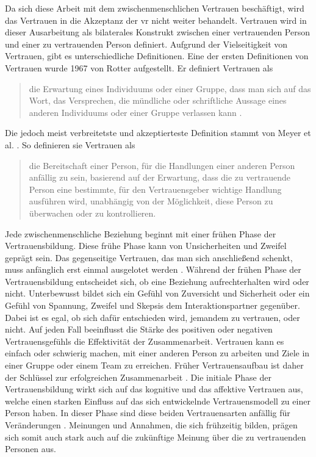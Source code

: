 \documentclass[a4paper,11pt]{article}%
\renewcommand{\\}{\vspace*{0.5\baselineskip} \newline}
\begin{document}
Da sich diese Arbeit mit dem zwischenmenschlichen Vertrauen beschäftigt, wird das Vertrauen in die Akzeptanz der \ac{vr} nicht weiter behandelt.
Vertrauen wird in dieser Ausarbeitung als bilaterales Konstrukt zwischen einer vertrauenden Person und einer zu vertrauenden Person definiert.
Aufgrund der Vielseitigkeit von Vertrauen, gibt es unterschiedliche Definitionen. \newline
Eine der ersten Definitionen von Vertrauen wurde 1967 von Rotter aufgestellt. Er definiert Vertrauen als 
\begin{quote}
\glqq{}die Erwartung eines Individuums oder einer Gruppe, dass man sich auf das Wort, das Versprechen, die mündliche oder schriftliche Aussage eines anderen Individuums oder einer Gruppe verlassen kann\dq{} \citep[S.651]{rotter1967new}.
\end{quote}
Die jedoch meist verbreitetste und akzeptierteste Definition stammt von Meyer et al. \citep[S.712]{mayer1995integrative}. So definieren sie Vertrauen als 
\begin{quote} \glqq{}die Bereitschaft einer Person, für die Handlungen einer anderen Person anfällig zu sein, basierend auf der Erwartung, dass die zu vertrauende Person eine bestimmte, für den Vertrauensgeber wichtige Handlung ausführen wird, unabhängig von der Möglichkeit, diese Person zu überwachen oder zu kontrollieren.\dq{} \end{quote}
Jede zwischenmenschliche Beziehung beginnt mit einer frühen Phase der Vertrauensbildung. Diese frühe Phase kann von Unsicherheiten und Zweifel geprägt sein. Das gegenseitige Vertrauen, das man sich anschließend schenkt, muss anfänglich erst einmal ausgelotet werden \citep[S.166-168]{meyerson1996swift}.
Während der frühen Phase der Vertrauensbildung entscheidet sich, ob eine Beziehung aufrechterhalten wird oder nicht. Unterbewusst bildet sich ein Gefühl von Zuversicht und Sicherheit oder ein Gefühl von Spannung, Zweifel und Skepsis dem Interaktionspartner gegenüber. 
Dabei ist es egal, ob sich dafür entschieden wird, jemandem zu vertrauen, oder nicht. Auf jeden Fall beeinflusst die Stärke des positiven oder negativen Vertrauensgefühls die Effektivität der Zusammenarbeit. Vertrauen kann es einfach oder schwierig machen, mit einer anderen Person zu arbeiten und Ziele in einer Gruppe oder einem Team zu erreichen.
Früher Vertrauensaufbau ist daher der Schlüssel zur erfolgreichen Zusammenarbeit \citep[S.405-406]{bigley1998straining}.
Die initiale Phase der Vertrauensbildung wirkt sich auf das kognitive und das affektive Vertrauen aus, welche einen starken Einfluss auf das sich entwickelnde Vertrauensmodell zu einer Person haben. In dieser Phase sind diese beiden Vertrauensarten anfällig für Veränderungen \citep[S.461-462]{baldwin1992relational}.
Meinungen und Annahmen, die sich frühzeitig bilden, prägen sich somit auch stark auch auf die zukünftige Meinung über die zu vertrauenden Personen aus.
\end{document}
